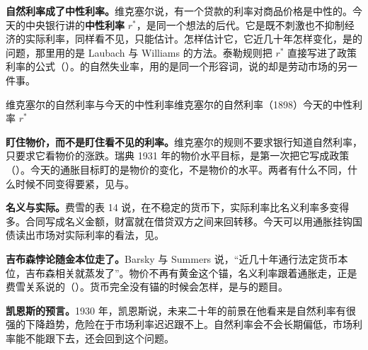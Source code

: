 \textbf{自然利率成了中性利率。}维克塞尔说，有一个贷款的利率对商品价格是中性的\cite{wicksell1936}。今天的中央银行讲的\textbf{中性利率} $r^{*}$，是同一个想法的后代。它是既不刺激也不抑制经济的实际利率，同样看不见，只能估计。怎样估计它，它近几十年怎样变化，是的问题，那里用的是 Laubach 与 Williams 的方法。泰勒规则把 $r^{*}$ 直接写进了政策利率的公式（）。的自然失业率，用的是同一个形容词，说的却是劳动市场的另一件事。

\begin{compare}{维克塞尔的自然利率与今天的中性利率}{维克塞尔的自然利率（1898）}{今天的中性利率 $r^{*}$}
\end{compare}

\textbf{盯住物价，而不是盯住看不见的利率。}维克塞尔的规则不要求银行知道自然利率，只要求它看物价的涨跌\cite{wicksell1936}。瑞典 1931 年的物价水平目标，是第一次把它写成政策（）\cite{berg1998}。今天的通胀目标盯的是物价的变化，不是物价的水平。两者有什么不同，什么时候不同变得要紧，见与。

\textbf{名义与实际。}费雪的表 14 说，在不稳定的货币下，实际利率比名义利率多变得多\cite{fisher1930}。合同写成名义金额，财富就在借贷双方之间来回转移。今天可以用通胀挂钩国债读出市场对实际利率的看法，见。

\textbf{吉布森悖论随金本位走了。}Barsky 与 Summers 说，“近几十年通行法定货币本位，吉布森相关就蒸发了”\cite{barsky1985}。物价不再有黄金这个锚，名义利率跟着通胀走，正是费雪关系说的（）。货币完全没有锚的时候会怎样，是与的题目。

\textbf{凯恩斯的预言。}1930 年，凯恩斯说，未来二十年的前景在他看来是自然利率有很强的下降趋势，危险在于市场利率迟迟跟不上\cite{keynes1930}。自然利率会不会长期偏低，市场利率能不能跟下去，还会回到这个问题。

